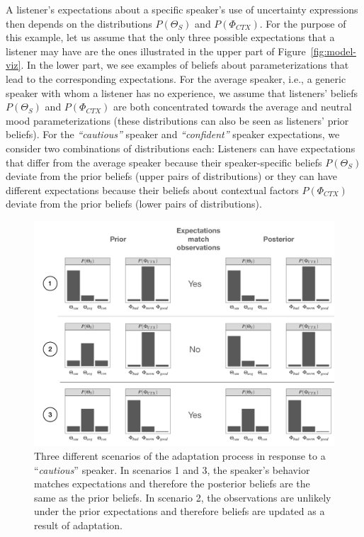 \documentclass[man,floatsintext]{apa6}
\begin{document}
A listener's expectations about a specific speaker's use of uncertainty expressions then depends on the distributions $P(\Theta_S)$ and $P(\Phi_{CTX})$. For the purpose of this example, let us assume that the only three possible expectations that a listener may have are the ones illustrated in the upper part of Figure~\ref{fig:model-viz}. In the lower part, we see examples of  beliefs about parameterizations that lead to the corresponding expectations. For the average speaker, i.e., a generic speaker with whom a listener has no experience, we assume that listeners' beliefs $P(\Theta_S)$ and $P(\Phi_{CTX})$ are both concentrated towards the average and neutral mood parameterizations (these distributions can also be seen as listeners' prior beliefs). For the \textit{``cautious''} speaker and \textit{``confident''} speaker expectations, we consider two combinations of distributions each: Listeners can have expectations that differ from the average speaker because their speaker-specific beliefs $P(\Theta_S)$ deviate from the prior beliefs (upper pairs of distributions) or they can have different expectations because their beliefs about contextual factors $P(\Phi_{CTX})$ deviate from the prior beliefs (lower pairs of distributions).

\begin{figure}[th!]
     \includegraphics[width=\columnwidth]{adaptation-paths}
    \caption{Three different scenarios of the adaptation process in response to a ``\textit{cautious}'' speaker. In scenarios 1 and 3, the speaker's behavior matches expectations and therefore the posterior beliefs are the same as the prior beliefs. In scenario 2, the observations are unlikely under the prior expectations and therefore beliefs are updated as a result of adaptation.}
    \label{fig:adaptation-scenarios}
\end{figure}
\end{document}
